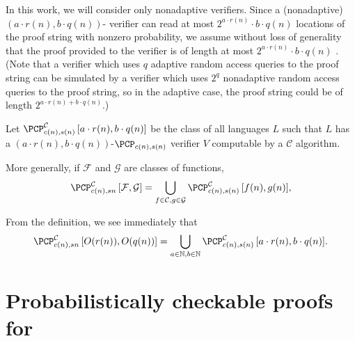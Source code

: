 \documentclass[]{article}
\newcommand{\PCPcs}[5]{\PCP^{#1}_{#2, #3}\left[#4, #5\right]}
\begin{document}
In this work, we will consider only nonadaptive \PCP{} verifiers.
Since a (nonadaptive) $(a \cdot r(n), b \cdot q(n))$-\PCP{} verifier can read at most $2^{a \cdot r(n)} \cdot b \cdot q(n)$ locations of the proof string with nonzero probability, we assume without loss of generality that the proof provided to the verifier is of length at most $2^{a \cdot r(n)} \cdot b \cdot q(n)$ \cite[Remark~11.6]{ab09}.
(Note that a verifier which uses $q$ adaptive random access queries to the proof string can be simulated by a verifier which uses $2^q$ nonadaptive random access queries to the proof string, so in the adaptive case, the proof string could be of length $2^{a \cdot r(n) + b \cdot q(n)}$.)

\begin{definition}
  Let $\PCPcs{\mathcal{C}}{c(n)}{s(n)}{a \cdot r(n)}{b \cdot q(n)}$ be the class of all languages $L$ such that $L$ has a $(a \cdot r(n), b \cdot q(n))$-$\PCP_{c(n), s(n)}$ verifier $V$ computable by a $\mathcal{C}$ algorithm.

  More generally, if $\mathcal{F}$ and $\mathcal{G}$ are classes of functions,
  \begin{equation*}
    \PCPcs{\mathcal{C}}{c(n)}{s{n}}{\mathcal{F}}{\mathcal{G}} = \bigcup_{f \in \mathcal{C}, g \in \mathcal{G}}{\PCPcs{\mathcal{C}}{c(n)}{s(n)}{f(n)}{g(n)}},
    \end{equation*}
\end{definition}

From the definition, we see immediately that
\begin{equation*}
  \PCPcs{\mathcal{C}}{c(n)}{s{n}}{O(r(n))}{O(q(n))} = \bigcup_{a \in \mathbb{N}, b \in \mathbb{N}}{\PCPcs{\mathcal{C}}{c(n)}{s(n)}{a \cdot r(n)}{b \cdot q(n)}}.
\end{equation*}

\section{Probabilistically checkable proofs for \texorpdfstring{\NP}{NP}}
\end{document}
